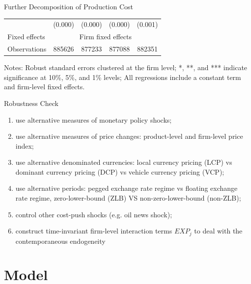 \documentclass[10pt]{beamer}
\begin{document}
\begin{frame}{Further Decomposition of Production Cost}
\begin{table}[htbp]
{\begin{threeparttable}
\begin{tabular}{lcccc}
                & (0.000) & (0.000) & (0.000) & (0.001) \\
                Fixed effects   &  \multicolumn{4}{c}{Firm fixed effects} \\   
                Observations    & 885626 & 877233 & 877088 & 882351 \\
                \bottomrule
            \end{tabular}
            \begin{tablenotes}
                \footnotesize
                \item Notes: Robust standard errors clustered at the firm level;  *, **, and *** indicate significance at 10\%, 5\%, and 1\% levels; All regressions include a constant term and firm-level fixed effects.
            \end{tablenotes}
        \end{threeparttable}
        }
	\label{tab.interest}
    \end{table}
\end{frame}

\begin{frame}{Robustness Check}
    \begin{enumerate}
        \item use alternative measures of monetary policy shocks; 
        \item use alternative measures of price changes: product-level and firm-level price index;
        \item use alternative denominated currencies: local currency pricing (LCP) vs dominant currency pricing (DCP) vs vehicle currency pricing (VCP);
        \item use alternative periods: pegged exchange rate regime vs floating exchange rate regime, zero-lower-bound (ZLB) VS non-zero-lower-bound (non-ZLB);
        \item control other cost-push shocks (e.g. oil news shock);
        \item construct time-invariant firm-level interaction terms $EXP_j$ to deal with the contemporaneous endogeneity
    \end{enumerate}
\end{frame}

\section{Model}
\end{document}
